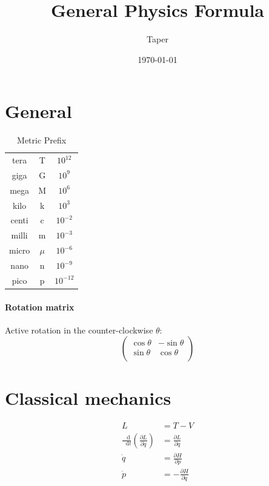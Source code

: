 \documentclass{article}
\title{General Physics Formula}
\date{\today}
\author{Taper}
\newcommand*\diff{\mathop{}\!\mathrm{d}}
\numberwithin{equation}{subsection} %
\theoremstyle{definition}
\begin{document}
\maketitle
{}
\tableofcontents

\section{General}
\label{sec:Table}

\begin{table}[H]
    \centering
    \caption{Metric Prefix}
    \begin{tabular}{c c c}
        tera  & T     & $10^{12}$ \\
        giga  & G     & $10^{9}$ \\
        mega  & M     & $10^{6}$ \\
        kilo  & k     & $10^{3}$ \\
        centi & c     & $10^{-2}$ \\
        milli & m     & $10^{-3}$ \\
        micro & $\mu$ & $10^{-6}$ \\
        nano  & n     & $10^{-9}$ \\
        pico  & p     & $10^{-12}$ \\
    \end{tabular}
\end{table}

\paragraph{Rotation matrix}
Active rotation in the counter-clockwise $\theta$:
\begin{equation}
    \left(
    \begin{array}{cc}
        \cos{\theta} & -\sin{\theta} \\
        \sin{\theta} & \cos{\theta} \\
    \end{array}
    \right)
\end{equation}

\section{Classical mechanics}
\label{sec:Classical-mechanics}

\begin{align}
L &= T- V\\
\frac{\diff}{\diff t} \left(\frac{\partial L}{\partial \dot{q}}\right)
    &= \frac{\partial L}{\partial q} \\
\dot{q} &= \frac{\partial H}{\partial p} \\
\dot{p} &= -\frac{\partial H}{\partial q}
\end{align}
\end{document}
